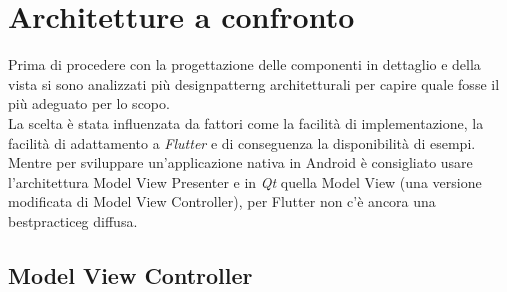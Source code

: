 \section{Architetture a confronto}
\label{sec:architetture-confronto}

Prima di procedere con la progettazione delle componenti in dettaglio e della vista si sono analizzati più \gls{designpatterng} architetturali per capire quale fosse il più adeguato per lo scopo.\\
La scelta è stata influenzata da fattori come la facilità di implementazione, la facilità di adattamento a \emph{Flutter} e di conseguenza la disponibilità di esempi.\\
Mentre per sviluppare un'applicazione nativa in Android è consigliato usare l'architettura Model View Presenter e in \emph{Qt} quella Model View (una versione modificata di Model View Controller), per Flutter non c'è ancora una \gls{bestpracticeg} diffusa.

\subsection{Model View Controller}
\label{subsec:model-view-controller}


